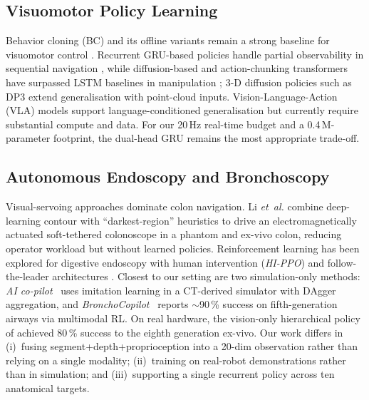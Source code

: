 \documentclass[journal,comsoc]{IEEEtran}
\begin{document}
\subsection{Visuomotor Policy Learning}
Behavior cloning (BC) and its offline variants remain a strong
baseline for visuomotor control
\cite{ross2011dagger,ho2016gail,cho2014gru}. Recurrent
GRU-based policies handle partial observability in sequential
navigation \cite{chi2023diffusion,zhao2023act}, while diffusion-based
and action-chunking transformers have surpassed LSTM baselines in
manipulation \cite{chi2023diffusion,zhao2023act}; 3-D diffusion
policies such as DP3 \cite{ze2024dp3} extend generalisation with
point-cloud inputs. Vision-Language-Action (VLA) models
\cite{kim2024openvla} support language-conditioned generalisation
but currently require substantial compute and data. For our 20\,Hz
real-time budget and a 0.4\,M-parameter footprint, the dual-head GRU
remains the most appropriate trade-off.

\subsection{Autonomous Endoscopy and Bronchoscopy}
Visual-servoing approaches dominate colon navigation. Li \emph{et~al.}
\cite{li2024east,li2024polyp} combine deep-learning contour with
``darkest-region'' heuristics to drive an electromagnetically
actuated soft-tethered colonoscope in a phantom and ex-vivo colon,
reducing operator workload but without learned policies. Reinforcement
learning has been explored for digestive endoscopy with human
intervention (\textit{HI-PPO}) and follow-the-leader architectures
\cite{pore2024hi}. Closest to our setting are two simulation-only
methods: \emph{AI co-pilot}~\cite{zhang2024aicopilot} uses
imitation learning in a CT-derived simulator with DAgger aggregation,
and \emph{BronchoCopilot}~\cite{pore2024bronchocopilot} reports
$\sim$90\,\% success on fifth-generation airways via multimodal RL.
On real hardware, the vision-only hierarchical policy of
\cite{longshort2026} achieved 80\,\% success to the eighth generation
ex-vivo. Our work differs in (i)~fusing segment+depth+proprioception
into a 20-dim observation rather than relying on a single modality;
(ii)~training on real-robot demonstrations rather than in simulation;
and (iii)~supporting a single recurrent policy across ten anatomical
targets.
\end{document}

